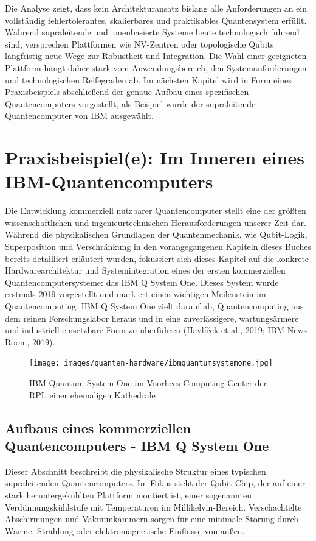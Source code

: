Die Analyse zeigt, dass kein Architekturansatz bislang alle Anforderungen an ein vollständig fehlertolerantes, skalierbares und praktikables Quantensystem erfüllt. Während supraleitende und ionenbasierte Systeme heute technologisch führend sind, versprechen Plattformen wie NV-Zentren oder topologische Qubits langfristig neue Wege zur Robustheit und Integration. Die Wahl einer geeigneten Plattform hängt daher stark vom Anwendungsbereich, den Systemanforderungen und technologischen Reifegraden ab. Im nächsten Kapitel wird in Form eines Praxisbeispiels abschließend der genaue Aufbau eines spezifischen Quantencomputers vorgestellt, als Beispiel wurde der supraleitende Quantencomputer von IBM ausgewählt.

\section{Praxisbeispiel(e): Im Inneren eines IBM-Quantencomputers}
Die Entwicklung kommerziell nutzbarer Quantencomputer stellt eine der größten wissenschaftlichen und ingenieurtechnischen Herausforderungen unserer Zeit dar. Während die physikalischen Grundlagen der Quantenmechanik, wie Qubit-Logik, Superposition und Verschränkung in den vorangegangenen Kapiteln dieses Buches bereits detailliert erläutert wurden, fokussiert sich dieses Kapitel auf die konkrete Hardwarearchitektur und Systemintegration eines der ersten kommerziellen Quantencomputersysteme: das IBM Q System One. Dieses System wurde erstmals 2019 vorgestellt und markiert einen wichtigen Meilenstein im Quantencomputing. IBM Q System One zielt darauf ab, Quantencomputing aus dem reinen Forschungslabor heraus und in eine zuverlässigere, wartungsärmere und industriell einsetzbare Form zu überführen (Havlíček et al., 2019; IBM News Room, 2019). 

\begin{figure}[H]
    \centering
    \texttt{[image: images/quanten-hardware/ibmquantumsystemone.jpg]}
    \caption{IBM Quantum System One im Voorhees Computing Center der RPI, einer ehemaligen Kathedrale}
    \label{fig:ibmquantumsystemone}
\end{figure}

\subsection{Aufbaus eines kommerziellen Quantencomputers - IBM Q System One}
Dieser Abschnitt beschreibt die physikalische Struktur eines typischen supraleitenden Quantencomputers. Im Fokus steht der Qubit-Chip, der auf einer stark heruntergekühlten Plattform montiert ist, einer sogenannten Verdünnungskühlstufe mit Temperaturen im Millikelvin-Bereich. Verschachtelte Abschirmungen und Vakuumkammern sorgen für eine minimale Störung durch Wärme, Strahlung oder elektromagnetische Einflüsse von außen.


